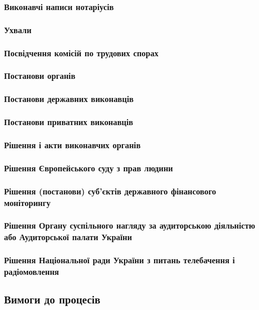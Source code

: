\documentclass{article}
\begin{document}
\subsubsection{Виконавчі написи нотаріусів}
\subsubsection{Ухвали}
\subsubsection{Посвідчення комісій по трудових спорах}
\subsubsection{Постанови органів}
\subsubsection{Постанови державних виконавців}
\subsubsection{Постанови приватних виконавців}
\subsubsection{Рішення і акти виконавчих органів}
\subsubsection{Рішення Європейського суду з прав людини}
\subsubsection{Рішення (постанови) суб’єктів державного фінансового моніторингу}
\subsubsection{Рішення Органу суспільного нагляду за аудиторською діяльністю або Аудиторської палати України}
\subsubsection{Рішення Національної ради України з питань телебачення і радіомовлення}

\subsection{Вимоги до процесів}
\end{document}

